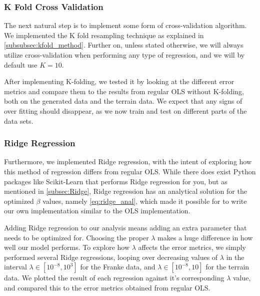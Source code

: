 \documentclass[10pt, twocolumn]{article}
\begin{document}
\subsubsection{K Fold Cross Validation}
The next natural step is to implement some form of cross-validation algorithm. We implemented the K fold resampling technique as explained in \cref{subsubsec:kfold_method}. Further on, unless stated otherwise, we will always utilize cross-validation when performing any type of regression, and we will by default use $K=10$.

After implementing K-folding, we tested it by looking at the different error metrics and compare them to the results from regular OLS without K-folding, both on the generated data and the terrain data. We expect that any signs of over fitting should disappear, as we now train and test on different parts of the data sets. 


\subsubsection{Ridge Regression}
Furthermore, we implemented Ridge regression, with the intent of exploring how this method of regression differs from regular OLS. While there does exist Python packages like Scikit-Learn that performs Ridge regression for you, but as mentioned in \cref{subsec:Ridge}, Ridge regression has an analytical solution for the optimized $\beta$ values, namely \cref{eq:ridge_anal}, which made it possible for to write our own implementation similar to the OLS implementation.  

Adding Ridge regression to our analysis means adding an extra parameter that needs to be optimized for. Choosing the proper $\lambda$ makes a huge difference in how well our model performs. To explore how $\lambda$ affects the error metrics, we simply performed several Ridge regressions, looping over decreasing values of $\lambda$ in the interval $\lambda \in [10^{-8}, 10^3]$ for the Franke data, and $\lambda \in [10^{-8}, 10]$ for the terrain data. We plotted the result of each regression against it's corresponding $\lambda$ value, and compared this to the error metrics obtained from regular OLS. 
\end{document}
